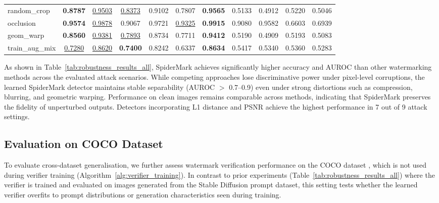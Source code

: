 \documentclass[lettersize,journal,review]{IEEEtran}
\begin{document}
\begin{table}[h]
{\begin{tabular}{lcccccccccc}
random\_crop    
& \textbf{0.8787} & \underline{0.9503}
& \underline{0.8373} & 0.9102
& 0.7807 & \textbf{0.9565}
& 0.5133 & 0.4912
& 0.5220 & 0.5046
\\

occlusion       
& \textbf{0.9574} & \underline{0.9878}
& 0.9067 & 0.9721
& \underline{0.9325} & \textbf{0.9915}
& 0.9080 & 0.9582
& 0.6603 & 0.6939
\\

geom\_warp      
& \textbf{0.8560} & \underline{0.9381}
& \underline{0.7893} & 0.8734
& 0.7711 & \textbf{0.9412}
& 0.5190 & 0.4909
& 0.5193 & 0.5083
\\

train\_aug\_mix 
& \underline{0.7280} & \underline{0.8620}
& \textbf{0.7400} & 0.8242 
& 0.6337 & \textbf{0.8634}
& 0.5417 & 0.5340
& 0.5360 & 0.5283
\\

\bottomrule
\end{tabular}

}
\end{table}




As shown in Table~\ref{tab:robustness_results_all}, SpiderMark achieves significantly higher accuracy and AUROC than other watermarking methods across the evaluated attack scenarios. 
While competing approaches lose discriminative power under pixel-level corruptions, the learned SpiderMark detector maintains stable separability (AUROC $>$ 0.7--0.9) even under strong distortions such as compression, blurring, and geometric warping. 
Performance on clean images remains comparable across methods, indicating that SpiderMark preserves the fidelity of unperturbed outputs. 
Detectors incorporating L1 distance and PSNR achieve the highest performance in 7 out of 9 attack settings.


\subsection{Evaluation on COCO Dataset}

To evaluate cross-dataset generalisation, we further assess watermark verification performance on the COCO dataset \cite{lin2014microsoft}, which is not used during verifier training (Algorithm~\ref{alg:verifier_training}). In contrast to prior experiments (Table~\ref{tab:robustness_results_all}) where the verifier is trained and evaluated on images generated from the Stable Diffusion prompt dataset, this setting tests whether the learned verifier overfits to prompt distributions or generation characteristics seen during training.
\end{document}
